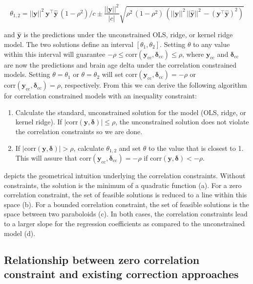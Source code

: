 \documentclass[utf8]{frontiersSCNS} %
\renewcommand{\a}{\theta}
\newcommand{\corr}{\text{corr}}
\renewcommand{\d}{\boldsymbol{\delta}}
\newcommand{\y}{\mathbf{y}}
\newcommand{\yh}{\mathbf{\hat{y}}}
\begin{document}
\begin{equation*}
\a_{1,2} = ||\y||^2\ \y^\top\yh\,(1-\rho^2)/c \pm \frac{||\y||^2}{|c|}\sqrt{\rho^2\,(1-\rho^2)\,(||\y||^2\,||\yh||^2\,-(\y^\top\yh)^2)}
\end{equation*}

and $\yh$ is the predictions under the unconstrained OLS, ridge, or kernel ridge model. The two solutions define an interval $[\a_1, \a_2]$. Setting $\a$ to any value within this interval will guarantee $-\rho\le\corr(\y_\text{cc},\d_\text{cc})\le\rho$, where $\y_\text{cc}$ and $\d_\text{cc}$ are now the predictions and brain age delta under the correlation constrained models. Setting $\a = \a_1$ or $\a = \a_2$ will set $\corr(\y_\text{cc},\d_\text{cc})=-\rho$ or $\corr(\y_\text{cc},\d_\text{cc})=\rho$, respectively. From this we can derive the following algorithm for correlation  constrained models with an inequality constraint:


\begin{enumerate}
    \item Calculate the standard, unconstrained solution for the model (OLS, ridge, or kernel ridge). If $|\corr(\y,\d)|\le\rho$, the unconstrained solution does not violate the correlation constraints so we are done.
    \item If $|\corr(\y,\d)|>\rho$, calculate $\a_{1,2}$ and set $\a$ to the value that is closest to 1. This will assure that $\corr(\y_\text{cc},\d_\text{cc})=-\rho$ if $\corr(\y,\d)<-\rho$.
\end{enumerate}


 depicts the geometrical intuition underlying the correlation constraints. Without constraints, the solution is the minimum of a quadratic function (a). For a zero correlation constraint, the set of feasible solutions is reduced to a line within this space (b). For a bounded correlation constraint, the set of feasible solutions is the space between two paraboloids (c). In both cases, the correlation constraints lead to a larger slope for the regression coefficients as compared to the unconstrained model (d). 


\subsection{Relationship between zero correlation constraint and existing correction approaches}\label{sec:relationship}
\end{document}

